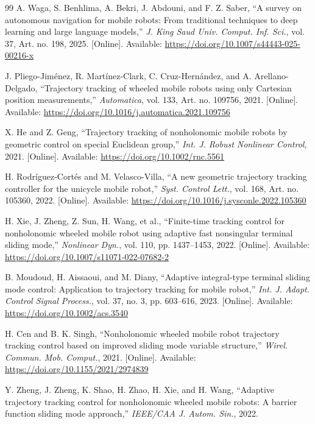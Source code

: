 \begin{thebibliography}{99}
A. Waga, S. Benhlima, A. Bekri, J. Abdouni, and F. Z. Saber, ``A survey on autonomous navigation for mobile robots: From traditional techniques to deep learning and large language models,'' \emph{J. King Saud Univ. Comput. Inf. Sci.}, vol. 37, Art. no. 198, 2025. [Online]. Available: \url{https://doi.org/10.1007/s44443-025-00216-x}

J. Pliego-Jim\'enez, R. Mart\'inez-Clark, C. Cruz-Hern\'andez, and A. Arellano-Delgado, ``Trajectory tracking of wheeled mobile robots using only Cartesian position measurements,'' \emph{Automatica}, vol. 133, Art. no. 109756, 2021. [Online]. Available: \url{https://doi.org/10.1016/j.automatica.2021.109756}

X. He and Z. Geng, ``Trajectory tracking of nonholonomic mobile robots by geometric control on special Euclidean group,'' \emph{Int. J. Robust Nonlinear Control}, 2021. [Online]. Available: \url{https://doi.org/10.1002/rnc.5561}

H. Rodr\'iguez-Cort\'es and M. Velasco-Villa, ``A new geometric trajectory tracking controller for the unicycle mobile robot,'' \emph{Syst. Control Lett.}, vol. 168, Art. no. 105360, 2022. [Online]. Available: \url{https://doi.org/10.1016/j.sysconle.2022.105360}

H. Xie, J. Zheng, Z. Sun, H. Wang, et al., ``Finite-time tracking control for nonholonomic wheeled mobile robot using adaptive fast nonsingular terminal sliding mode,'' \emph{Nonlinear Dyn.}, vol. 110, pp. 1437--1453, 2022. [Online]. Available: \url{https://doi.org/10.1007/s11071-022-07682-2}

B. Moudoud, H. Aissaoui, and M. Diany, ``Adaptive integral-type terminal sliding mode control: Application to trajectory tracking for mobile robot,'' \emph{Int. J. Adapt. Control Signal Process.}, vol. 37, no. 3, pp. 603--616, 2023. [Online]. Available: \url{https://doi.org/10.1002/acs.3540}

H. Cen and B. K. Singh, ``Nonholonomic wheeled mobile robot trajectory tracking control based on improved sliding mode variable structure,'' \emph{Wirel. Commun. Mob. Comput.}, 2021. [Online]. Available: \url{https://doi.org/10.1155/2021/2974839}

Y. Zheng, J. Zheng, K. Shao, H. Zhao, H. Xie, and H. Wang, ``Adaptive trajectory tracking control for nonholonomic wheeled mobile robots: A barrier function sliding mode approach,'' \emph{IEEE/CAA J. Autom. Sin.}, 2022.


\end{thebibliography}
